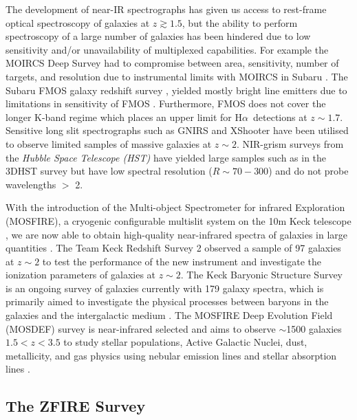 \documentclass[iop]{emulateapj}
\newcommand{\Halpha}{H$\alpha$}
\newcommand{\around}{$\sim$}
\begin{document}
The development of near-IR spectrographs has given us access to rest-frame optical spectroscopy of galaxies at $z\gtrsim1.5$, but the ability to perform spectroscopy of a large number of galaxies has been hindered due to low sensitivity and/or unavailability of multiplexed capabilities. 
For example the MOIRCS Deep Survey \citep{Kajisawa2006} had to compromise between area, sensitivity, number of targets, and resolution due to instrumental limits with MOIRCS in Subaru \citep{Ichikawa2006}. 
The Subaru FMOS galaxy redshift survey \cite{Tonegawa2015}, yielded mostly bright line emitters due to limitations in sensitivity of FMOS \citep{Kimura2010}. 
Furthermore, FMOS does not cover the longer K-band regime which places an upper limit for \Halpha\ detections at $z\sim1.7$. Sensitive long slit spectrographs such as GNIRS  \citep{Elias2006} and XShooter \citep{Vernet2011} have been utilised to observe limited samples of massive galaxies at $z\sim2$.
NIR-grism surveys from the \emph{Hubble Space Telescope (HST)} have yielded large samples such as in the 3DHST survey \citep{Momcheva2015,Treu2015} but have low spectral resolution ($R\sim70-300$) and do not probe wavelengths $>$ 2\micron.



With the introduction of the Multi-object Spectrometer for infrared Exploration (MOSFIRE), a cryogenic configurable multislit system on the 10m Keck telescope \citep{McLean2012}, we are now able to obtain high-quality near-infrared spectra of galaxies in large quantities \citep{Kulas2013,Steidel2014,Kriek2015,Wirth2015}. 
The Team Keck Redshift Survey 2 observed a sample of 97 galaxies at $z\sim2$ to test the performance of the new instrument \citep{Wirth2015} and  investigate the ionization parameters of galaxies at $z\sim2$.
The Keck Baryonic Structure Survey is an ongoing survey of galaxies currently with 179 galaxy spectra, which is primarily aimed to investigate the physical processes between baryons in the galaxies and the intergalactic medium \citep{Steidel2014}. 
The MOSFIRE Deep Evolution Field (MOSDEF) survey is near-infrared selected and aims to observe \around1500 galaxies $1.5<z<3.5$ to study stellar populations, Active Galactic Nuclei, dust, metallicity, and gas physics  using  nebular emission lines and stellar absorption lines \citep{Kriek2015}. 

\subsection{The ZFIRE Survey}
\end{document}
